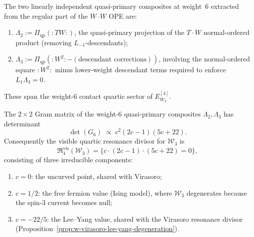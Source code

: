 \begin{definition}
\label{def:w-w3-weight6-composites}
The two linearly independent quasi-primary composites at weight~$6$
extracted from the regular part of the $W$--$W$ OPE are:
\begin{enumerate}[label=\textup{(\roman*)}]
\item $\Lambda_2 := \Pi_{\mathrm{qp}}({:}TW{:})$, the quasi-primary
  projection of the $T \cdot W$ normal-ordered product (removing
  $L_{-1}$-descendants);
\item $\Lambda_3 := \Pi_{\mathrm{qp}}({:}W^2{:} - (\text{descendant
  corrections}))$, involving the normal-ordered square ${:}W^2{:}$
  minus lower-weight descendant terms required to enforce
  $L_1\Lambda_3 = 0$.
\end{enumerate}
These span the weight-$6$ contact quartic sector of
$E^{[4]}_{W_3}$.
\end{definition}

\begin{proposition}
\label{prop:w-w3-weight6-resonance}
The $2\times 2$ Gram matrix of the weight-$6$ quasi-primary
composites $\Lambda_2, \Lambda_3$ has determinant
\begin{equation}
\label{eq:w-w3-weight6-gram-det}
\det(G_6) \;\propto\; c^2(2c-1)(5c+22).
\end{equation}
Consequently the visible quartic resonance divisor for
$\mathcal{W}_3$ is
\begin{equation}
\label{eq:w-w3-visible-resonance-divisor}
\mathfrak R^{\mathrm{vis}}_4(\mathcal{W}_3)
= \bigl\{c \cdot (2c-1) \cdot (5c+22) = 0\bigr\},
\end{equation}
consisting of three irreducible components:
\begin{enumerate}[label=\textup{(\alph*)}]
\item $c = 0$: the uncurved point, shared with Virasoro;
\item $c = 1/2$: the free fermion value (Ising model),
  where $\mathcal{W}_3$ degenerates because the spin-$3$
  current becomes null;
\item $c = -22/5$: the Lee--Yang value, shared with the
  Virasoro resonance divisor
  (Proposition~\ref{prop:w-virasoro-lee-yang-degeneration}).
\end{enumerate}
\end{proposition}

